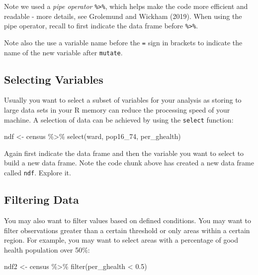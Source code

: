 \documentclass[
  letterpaper,
  krantz2]{style/krantz}
\newenvironment{Shaded}{\begin{snugshade}}{\end{snugshade}}
\newcommand{\FloatTok}[1]{\textcolor[rgb]{0.68,0.00,0.00}{#1}}
\newcommand{\FunctionTok}[1]{\textcolor[rgb]{0.28,0.35,0.67}{#1}}
\newcommand{\NormalTok}[1]{\textcolor[rgb]{0.00,0.23,0.31}{#1}}
\newcommand{\OtherTok}[1]{\textcolor[rgb]{0.00,0.23,0.31}{#1}}
\newcommand{\SpecialCharTok}[1]{\textcolor[rgb]{0.37,0.37,0.37}{#1}}
\begin{document}
Note we used a \emph{pipe operator} \texttt{\%\textgreater{}\%}, which
helps make the code more efficient and readable - more details, see
Grolemund and Wickham (2019). When using the pipe operator, recall to
first indicate the data frame before \texttt{\%\textgreater{}\%}.

Note also the use a variable name before the \texttt{=} sign in brackets
to indicate the name of the new variable after \texttt{mutate}.

\hypertarget{selecting-variables}{%
\subsection{Selecting Variables}\label{selecting-variables}}

Usually you want to select a subset of variables for your analysis as
storing to large data sets in your R memory can reduce the processing
speed of your machine. A selection of data can be achieved by using the
\texttt{select} function:

\begin{Shaded}
\begin{Highlighting}[]
\NormalTok{ndf }\OtherTok{\textless{}{-}}\NormalTok{ census }\SpecialCharTok{\%\textgreater{}\%} \FunctionTok{select}\NormalTok{(ward, pop16\_74, per\_ghealth)}
\end{Highlighting}
\end{Shaded}

Again first indicate the data frame and then the variable you want to
select to build a new data frame. Note the code chunk above has created
a new data frame called \texttt{ndf}. Explore it.

\hypertarget{filtering-data}{%
\subsection{Filtering Data}\label{filtering-data}}

You may also want to filter values based on defined conditions. You may
want to filter observations greater than a certain threshold or only
areas within a certain region. For example, you may want to select areas
with a percentage of good health population over 50\%:

\begin{Shaded}
\begin{Highlighting}[]
\NormalTok{ndf2 }\OtherTok{\textless{}{-}}\NormalTok{ census }\SpecialCharTok{\%\textgreater{}\%} \FunctionTok{filter}\NormalTok{(per\_ghealth }\SpecialCharTok{\textless{}} \FloatTok{0.5}\NormalTok{)}
\end{Highlighting}
\end{Shaded}
\end{document}

